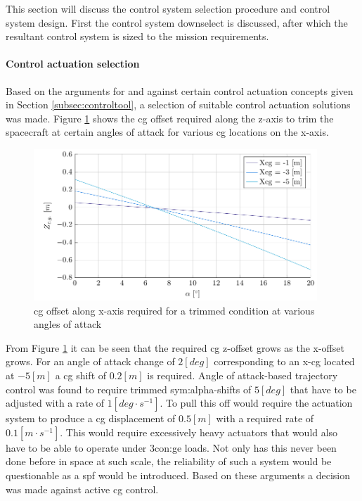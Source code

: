 This section will discuss the control system selection procedure and control system design. First the control system downselect is discussed, after which the resultant control system is sized to the mission requirements.

\paragraph{Control actuation selection}
Based on the arguments for and against certain control actuation concepts given in Section \ref{subsec:controltool}, a selection of suitable control actuation solutions was made. Figure \ref{fig:cgoffset} shows the \gls{cg} offset required along the z-axis to trim the spacecraft at certain angles of attack for various \gls{cg} locations on the x-axis. 
\begin{figure}[h]
	\centering
	\includegraphics[width=0.95\textwidth]{./Figure/control/moment}
	\caption[\acrlong{cg} offset along z-axis required for a trimmed condition at various angles of attack]{\gls{cg} offset along x-axis required for a trimmed condition at various angles of attack}
	\label{fig:cgoffset}
\end{figure}
From Figure \ref{fig:cgoffset} it can be seen that the required \gls{cg} z-offset grows as the x-offset grows. For an angle of attack change of $2 \left[deg\right]$ corresponding to an x-\gls{cg} located at $-5 \left[m\right]$ a \gls{cg} shift of $0.2 \left[m\right]$ is required. Angle of attack-based trajectory control was found to require trimmed \gls{sym:alpha}-shifts of $5 \left[deg\right]$ that have to be adjusted with a rate of $1 \left[deg \cdot s^{-1}\right]$. To pull this off would require the actuation system to produce a \gls{cg} displacement of $0.5 \left[m\right]$ with a required rate of $0.1 \left[m \cdot s^{-1}\right]$. This would require excessively heavy actuators that would also have to be able to operate under 3\gls{con:ge} loads. Not only has this never been done before in space at such scale, the reliability of such a system would be questionable as a \gls{spf} would be introduced. Based on these arguments a decision was made against active \gls{cg} control.

